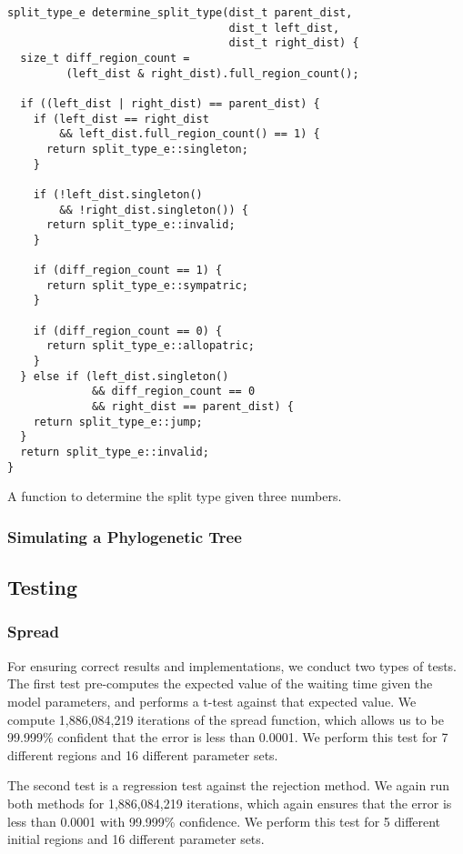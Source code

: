 \documentclass[a4paper]{article}
\begin{document}
\begin{listing}
	\begin{verbatim}
split_type_e determine_split_type(dist_t parent_dist, 
                                  dist_t left_dist, 
                                  dist_t right_dist) {
  size_t diff_region_count =
         (left_dist & right_dist).full_region_count();

  if ((left_dist | right_dist) == parent_dist) {
    if (left_dist == right_dist 
        && left_dist.full_region_count() == 1) {
      return split_type_e::singleton;
    }

    if (!left_dist.singleton() 
        && !right_dist.singleton()) {
      return split_type_e::invalid;
    }

    if (diff_region_count == 1) {
      return split_type_e::sympatric;
    }

    if (diff_region_count == 0) {
      return split_type_e::allopatric;
    }
  } else if (left_dist.singleton()
             && diff_region_count == 0
             && right_dist == parent_dist) {
    return split_type_e::jump;
  }
  return split_type_e::invalid;
}
\end{verbatim}
	\caption{A function to determine the split type given three numbers.}
	\label{lst:determine-split-type}
\end{listing}

\subsubsection{Simulating a Phylogenetic Tree}


\subsection{Testing}

\subsubsection{Spread}

For ensuring correct results and implementations, we conduct two types of tests.
The first test pre-computes the expected value of the waiting time given the
model parameters, and performs a t-test against that expected value.
We compute 1,886,084,219 iterations of the spread function, which allows us to
be 99.999\% confident that the error is less than 0.0001.
We perform this test for 7 different regions and 16 different parameter sets.

The second test is a regression test against the rejection method.
We again run both methods for 1,886,084,219 iterations, which again ensures
that the error is less than 0.0001 with 99.999\% confidence.
We perform this test for 5 different initial regions and 16 different parameter
sets.
\end{document}
